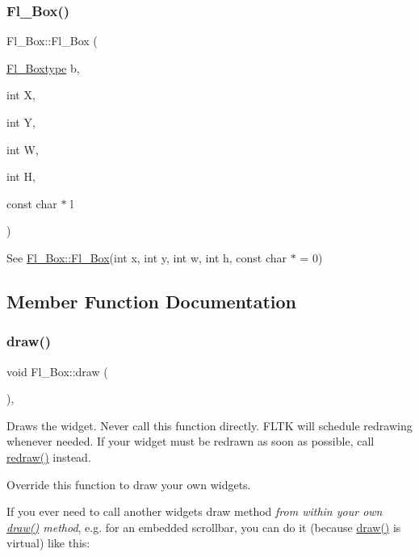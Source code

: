 \subsubsection{\texorpdfstring{Fl\+\_\+\+Box()}{Fl\_Box()}\hspace{0.1cm}{\footnotesize\ttfamily [2/2]}}
{\footnotesize\ttfamily Fl\+\_\+\+Box\+::\+Fl\+\_\+\+Box (\begin{DoxyParamCaption}\item[{\hyperlink{_enumerations_8_h_ae48bf9070f8541de17829f54ccacc6bc}{Fl\+\_\+\+Boxtype}}]{b,  }\item[{int}]{X,  }\item[{int}]{Y,  }\item[{int}]{W,  }\item[{int}]{H,  }\item[{const char $\ast$}]{l }\end{DoxyParamCaption})}

See \hyperlink{class_fl___box_aefe388870c477330fb646b450fd5225c}{Fl\+\_\+\+Box\+::\+Fl\+\_\+\+Box}(int x, int y, int w, int h, const char $\ast$ = 0) 

\subsection{Member Function Documentation}
\mbox{\label{class_fl___box_a68ad5028e9911fa875d79f686f80b3e8}} 
\subsubsection{\texorpdfstring{draw()}{draw()}}
{\footnotesize\ttfamily void Fl\+\_\+\+Box\+::draw (\begin{DoxyParamCaption}{ }\end{DoxyParamCaption})\hspace{0.3cm}{\ttfamily [protected]}, {\ttfamily [virtual]}}

Draws the widget. Never call this function directly. F\+L\+TK will schedule redrawing whenever needed. If your widget must be redrawn as soon as possible, call \hyperlink{class_fl___widget_aa63ce68cbf4620cf8750b868368ea02b}{redraw()} instead.

Override this function to draw your own widgets.

If you ever need to call another widget\textquotesingle{}s draw method {\itshape from within your own \hyperlink{class_fl___box_a68ad5028e9911fa875d79f686f80b3e8}{draw()} method}, e.\+g. for an embedded scrollbar, you can do it (because \hyperlink{class_fl___box_a68ad5028e9911fa875d79f686f80b3e8}{draw()} is virtual) like this\+:


